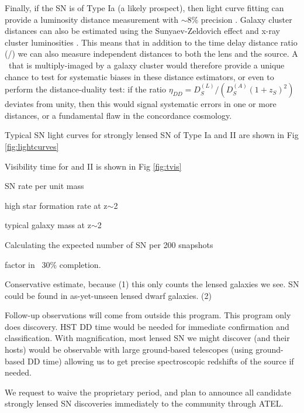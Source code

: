 Finally, if the SN is of Type Ia (a likely prospect), then light curve
fitting can provide a luminosity distance measurement with $\sim$8\%
precision \citep{Phillips:1993}.  Galaxy cluster distances can also be
estimated using the Sunyaev-Zeldovich effect and x-ray cluster
luminosities \citep{Silk:1978}.  This means that in addition to the
time delay distance ratio (\Dl\Ds/\Dls) we can also measure
independent distances to both the lens and the source.  A \SNIa\ that
is multiply-imaged by a galaxy cluster would therefore provide a
unique chance to test for systematic biases in these distance
estimators, or even to perform the distance-duality test: if the
ratio $\eta_{DD} = D_{S}^{(L)} / ( D_{S}^{(A)}(1+z_S)^2 )$ deviates
from unity, then this would signal systematic errors in one or more
distances, or a fundamental flaw in the concordance cosmology.





\medskip
{}

Typical SN light curves for strongly lensed SN of Type Ia and II are shown in Fig \ref{fig:lightcurves}

Visibility time for \SNIa and II is shown in Fig \ref{fig:tvis}

SN rate per unit mass \citep{Mannucci:2005}

high star formation rate at z$\sim$2

typical galaxy mass at z$\sim$2

Calculating the expected number of SN per 200 snapshots

factor in ~30\% completion.

Conservative estimate, because  
 (1) this only counts the lensed galaxies we see.  SN could be found
 in as-yet-unseen lensed dwarf galaxies. 
 (2) 



Follow-up observations will come from outside this program. 
This program only does discovery.
HST DD time would be needed for immediate confirmation and classification.
With magnification, most lensed SN we might discover (and their hosts)
would be observable with large ground-based telescopes (using
ground-based DD time)   allowing us to get precise spectroscopic
redshifts of the source if needed.

We request to waive the proprietary period, and plan to announce all
     candidate strongly lensed SN discoveries immediately to the
     community through ATEL.

